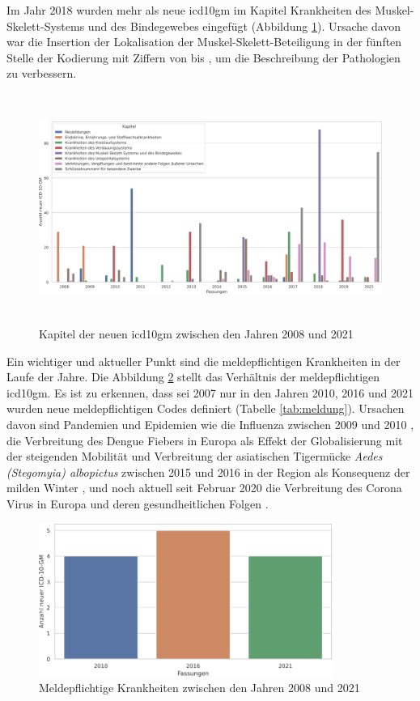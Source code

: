 Im Jahr 2018 wurden mehr als {} neue \ac{icd10gm} im Kapitel {\ttfamily Krankheiten des Muskel-Skelett-Systems und des Bindegewebes} eingefügt (Abbildung \ref{fig:newicdcap}). Ursache davon war die Insertion der Lokalisation der Muskel-Skelett-Beteiligung in der fünften Stelle der Kodierung mit Ziffern von {} bis {}, um die Beschreibung der Pathologien zu verbessern.

\begin{figure}[ht]
	\centering
	\includegraphics[height=7.5cm]{figures/kaptnrYear}
	\caption[Kapitel der \acs{icd10gm} pro Jahr]{Kapitel der neuen \acs{icd10gm} zwischen den Jahren 2008 und 2021}
	\label{fig:newicdcap}
\end{figure} 

Ein wichtiger und aktueller Punkt sind die meldepflichtigen Krankheiten in der Laufe der Jahre. Die Abbildung \ref{fig:newicdmeld} stellt das Verhältnis der meldepflichtigen \ac{icd10gm}. Es ist zu erkennen, dass sei 2007 nur in den Jahren 2010, 2016 und 2021 wurden neue meldepflichtigen Codes definiert (Tabelle \ref{tab:meldung}). Ursachen davon sind Pandemien und Epidemien wie die Influenza zwischen 2009 und 2010 \cite{influenza1, influenza2}, die Verbreitung des Dengue Fiebers in Europa als Effekt der Globalisierung mit der steigenden Mobilität \cite{denge1} und Verbreitung der asiatischen Tigermücke \textsl{Aedes (Stegomyia) albopictus} zwischen 2015 und 2016 in der Region als Konsequenz der milden Winter \cite{denge2}, und noch aktuell seit Februar 2020 die Verbreitung des Corona Virus in Europa \cite{corona1} und deren gesundheitlichen Folgen \cite{corona2}.

\begin{figure}[ht]
	\centering
	\includegraphics[height=5cm]{figures/arztJaYear}
	\caption[Meldepflichtige \acs{icd10gm} pro Jahr]{Meldepflichtige Krankheiten zwischen den Jahren 2008 und 2021}
	\label{fig:newicdmeld}
\end{figure} 

